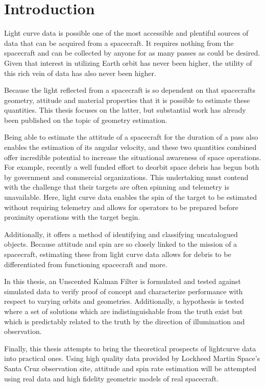 \chapter{Introduction}

Light curve data is possible one of the most accessible and plentiful sources of data that can be acquired from a spacecraft. It requires nothing from the spacecraft and can be collected by anyone for as many passes as could be desired. Given that interest in utilizing Earth orbit has never been higher, the utility of this rich vein of data has also never been higher.

Because the light reflected from a spacecraft is so dependent on that spacecrafts geometry, attitude and material properties that it is possible to estimate these quantities. This thesis focuses on the latter, but substantial work has already been published on the topic of geometry estimation.

Being able to estimate the attitude of a spacecraft for the duration of a pass also enables the estimation of its angular velocity, and these two quantities combined offer incredible potential to increase the situational awareness of space operations. For example, recently a well funded effort to deorbit space debris has begun both by government and commercial organizations. This undertaking must contend with the challenge that their targets are often spinning and telemetry is unavailable. Here, light curve data enables the spin of the target to be estimated without requiring telemetry and allows for operators to be prepared before proximity operations with the target begin.

Additionally, it offers a method of identifying and classifying uncatalogued objects. Because attitude and spin are so closely linked to the mission of a spacecraft, estimating these from light curve data allows for debris to be differentiated from functioning spacecraft and more.

In this thesis, an Unscented Kalman Filter is formulated and tested against simulated data to verify proof of concept and characterize performance with respect to varying orbits and geometries. Additionally, a hypothesis is tested where a set of solutions which are indistinguishable from the truth exist but which is predictably related to the truth by the direction of illumination and observation.

Finally, this thesis attempts to bring the theoretical prospects of lightcurve data into practical ones. Using high quality data provided by Lockheed Martin Space's Santa Cruz observation site, attitude and spin rate estimation will be attempted using real data and high fidelity geometric models of real spacecraft. 